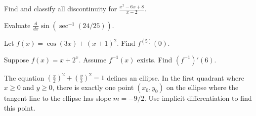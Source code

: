 \documentclass[../main.tex]{subfiles}
\begin{document}
\begin{exercise}
  Find and classify all discontinuity for \(\frac{x^{2} - 6x + 8}{x-2}\).
  
  \blanks*
\end{exercise}
\clearpage



  

\begin{exercise}
  Evaluate \(\frac{d}{dx} \sin(\sec^{-1}(24/25))\).
  
  \blanks*
\end{exercise}

\begin{exercise}
  Let \(f(x) = \cos(3x) + (x+1)^{2}\). Find \(f^{(5)}(0)\). 
  
  \blanks*
\end{exercise}

\begin{exercise}
  Suppose \(f(x) = x + 2^{x}\). Assume \(f^{-1}(x)\) exists. Find \(\left(f^{-1}\right)'(6)\).
  
  \blanks*
\end{exercise}



\clearpage

\begin{exercise}
  The equation \(\left(\frac{x}{2}\right)^{2} + \left( \frac{y}{3} \right)^{2} = 1\) defines an ellipse.  In the first quadrant where \(x \ge 0\) and \(y \ge 0\), there is exactly one point \((x_{0}, y_{0})\) on the ellipse where the tangent line to the ellipse has slope \(m = -9/2\).  Use implicit differentiation to find this point.

  \blanks*
\end{exercise}
\clearpage
\end{document}
